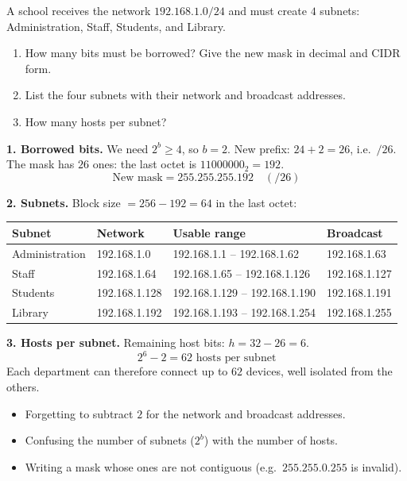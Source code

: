 \documentclass[11pt]{article}
\begin{document}
\begin{exoresolu}
A school receives the network $192.168.1.0/24$ and must create $4$ subnets: Administration, Staff, Students, and Library.
\begin{enumerate}
\item How many bits must be borrowed? Give the new mask in decimal and CIDR form.
\item List the four subnets with their network and broadcast addresses.
\item How many hosts per subnet?
\end{enumerate}
\tcblower
\textbf{1. Borrowed bits.} We need $2^b \ge 4$, so $b = 2$. New prefix: $24 + 2 = 26$, i.e.\ $/26$. The mask has $26$ ones: the last octet is $11000000_2 = 192$.
\[ \text{New mask} = 255.255.255.192 \quad (/26) \]

\textbf{2. Subnets.} Block size $= 256 - 192 = 64$ in the last octet:

\begin{center}
\begin{tabularx}{\linewidth}{|l|X|X|X|}
\hline
\rowcolor{popblueL} \textbf{Subnet} & \textbf{Network} & \textbf{Usable range} & \textbf{Broadcast} \\
\hline
Administration & 192.168.1.0 & 192.168.1.1 -- 192.168.1.62 & 192.168.1.63 \\
\hline
Staff & 192.168.1.64 & 192.168.1.65 -- 192.168.1.126 & 192.168.1.127 \\
\hline
Students & 192.168.1.128 & 192.168.1.129 -- 192.168.1.190 & 192.168.1.191 \\
\hline
Library & 192.168.1.192 & 192.168.1.193 -- 192.168.1.254 & 192.168.1.255 \\
\hline
\end{tabularx}
\end{center}

\textbf{3. Hosts per subnet.} Remaining host bits: $h = 32 - 26 = 6$.
\[ 2^6 - 2 = 62 \text{ hosts per subnet} \]
Each department can therefore connect up to $62$ devices, well isolated from the others.
\end{exoresolu}

\begin{attention}
\begin{itemize}
\item Forgetting to subtract $2$ for the network and broadcast addresses.
\item Confusing the number of subnets ($2^b$) with the number of hosts.
\item Writing a mask whose ones are not contiguous (e.g.\ $255.255.0.255$ is invalid).
\end{itemize}
\end{attention}
\end{document}
